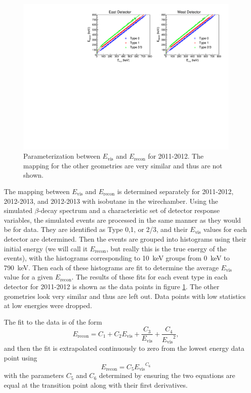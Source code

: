 \begin{figure}[h]
  \centering
  \includegraphics[scale=0.78]{3-UCNAAnalysis/2011-2012_Evis_to_Erecon.pdf}
  \caption{Parameterization between $E_{\mathrm{vis}}$ and $E_{\mathrm{recon}}$ for
    2011-2012. The mapping for the other geometries are very similar and thus are
    not shown.}
  \label{fig:Erecon}
\end{figure}

The mapping between $E_{\mathrm{vis}}$ and $E_{\mathrm{recon}}$ is determined separately
for 2011-2012, 2012-2013, and 2012-2013 with isobutane in the wirechamber.
Using the simulated $\beta$-decay spectrum and a characteristic set of detector
response variables, the simulated events are processed in the same manner as
they would be for data. They are identified as Type 0,1, or 2/3, and their
$E_{\mathrm{vis}}$ values for each detector are determined. Then the events are
grouped into histograms using their initial energy (we will call it $E_{\mathrm{recon}}$,
but really this is the true energy of the events), with the histograms corresponding
to 10~keV groups from 0~keV to 790~keV. Then each of these histograms are fit to
determine the average $E_{\mathrm{vis}}$ value for a given $E_{\mathrm{recon}}$. The results
of these fits for each event type in each detector for 2011-2012 is shown as the data
points in figure \ref{fig:Erecon}. The other geometries look very similar and thus are
left out. Data points with low statistics at low energies were dropped.

The fit to the data is of the form
\begin{equation}
  E_{\mathrm{recon}} = C_1 + C_2E_{\mathrm{vis}} + \frac{C_3}{E_{\mathrm{vis}}} + \frac{C_4}{{E_{\mathrm{vis}}}^2},
\end{equation}
and then the fit is extrapolated continuously to zero from the lowest energy data point using
\begin{equation}
  E_{\mathrm{recon}} = C_5{E_{\mathrm{vis}}}^{C_6}
\end{equation}
with the parameters $C_5$ and $C_6$ determined by ensuring the two equations are equal at the
transition point along with their first derivatives.

